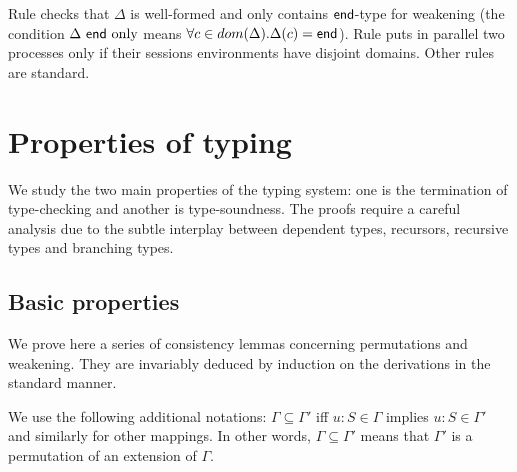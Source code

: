 \documentclass{LMCS}
\newcommand{\kf}[1]{\textup{\textsf{#1}}\xspace}
\newcommand{\Ga}{\ensuremath{\Gamma}}
\newcommand{\dom}[1]{\ensuremath{dom( #1)}}
\newcommand{\End}{\kf{end}}
\newcommand{\tftrule}[1]{{\text{\footnotesize[\text{\sc{#1}}]}}}
\newcommand{\AT}[2]{#1\! : \! #2}
\begin{document}
Rule \tftrule{TNull} checks that $\Delta$ is well-formed and only contains
$\End$-type for weakening (the condition $\Delta\ \End\text{ only}$ means $\forall c \in \dom{\Delta}.\Delta(c)=\End$). Rule \tftrule{TPar} puts in parallel two processes
only if their sessions environments have disjoint domains. 
Other rules are standard. 

\section{Properties of typing}
\label{sec:property}
\noindent 
We study the two main properties of the typing system: one is the
termination of type-checking and another is type-soundness. The proofs
require a careful analysis due to the subtle interplay between
dependent types, recursors, recursive types and branching types.
\subsection{Basic properties}
\label{sec:basic}
\noindent We prove here a series of consistency lemmas concerning permutations
and weakening.
They are invariably deduced by induction on the derivations in the
standard manner.  

We use the following additional notations: $\Ga
\subseteq \Ga'$ iff $\AT{u}{S}\in \Ga$ implies $\AT{u}{S}\in \Ga'$ and
similarly for other mappings. In other words, $\Ga \subseteq \Ga'$
means that $\Ga'$ is a permutation of an extension of $\Gamma$.
\end{document}
